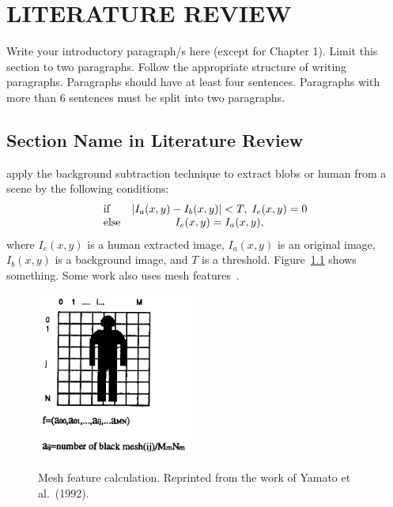 \setlength{\parindent}{0.5in} 
\setlength{\parskip}{0mm}
\setlength{\baselineskip}{1.6em}

\chapter{LITERATURE REVIEW}
\label{ch:literature-review}
Write your introductory paragraph/s here (except for Chapter 1). Limit this section to two paragraphs. Follow the appropriate structure of writing paragraphs. Paragraphs should have at least four sentences. Paragraphs with more than 6 sentences must be split into two paragraphs.

\section{Section Name in Literature Review}
\label{section-name-in-literature-review}

 apply the background subtraction 
technique to extract blobs or human from a scene by the 
following conditions:
\[
\begin{array}{lc}
  {\rm if} & \left|{I_a (x,y) - I_b (x,y)}\right|< T,\;I_e (x,y) = 0 \\ 
  {\rm else} & I_e (x,y) = I_a (x,y), 
\end{array}
\]
where $I_e (x,y)$ is a human extracted image, $I_a (x,y)$ is an
original image, $I_b (x,y)$ is a background image, and $T$ is a
threshold. Figure~\ref{fig:mesh-feature} shows something. Some work also uses 
mesh features~.


\begin{figure}[h]
  \centering
  \caption[Mesh feature calculation]{Mesh feature calculation. Reprinted from the work of Yamato et al.\ (1992).}
  \includegraphics[width=2in]{figures/mesh-feature.jpg}  
  \label{fig:mesh-feature}
\end{figure}

